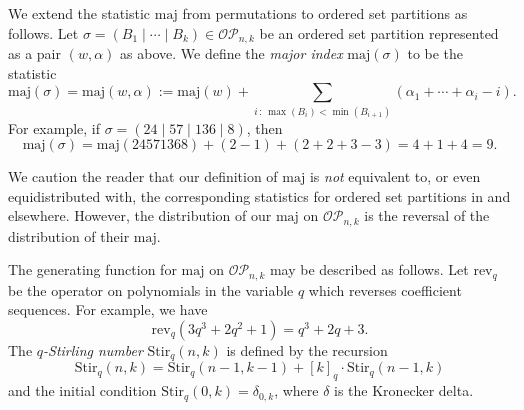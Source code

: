 \documentclass[ALCO,ThmDefs,published]{cedram}
\newcommand{\symm}{{\mathfrak{S}}}
\theoremstyle{plain}
\newcommand{\maj}{{\mathrm {maj}}}
\newcommand{\inv}{{\mathrm {inv}}}
\newcommand{\Stir}{{\mathrm {Stir}}}
\newcommand{\rev}{{\mathrm {rev}}}
\newcommand{\symm}{{\mathfrak{S}}}
\newcommand{\OP}{{\mathcal{OP}}}
\begin{document}



We extend the statistic $\maj$ from permutations to ordered set partitions as follows.
Let $\sigma = (B_1 \mid \cdots \mid B_k) \in \OP_{n,k}$ be an ordered set partition represented as a pair $(w, \alpha)$ as above.  
We define the \emph{major index} $\maj(\sigma)$ to be the statistic
\begin{equation}
\maj(\sigma) = \maj(w, \alpha) := \maj(w) + \sum_{i \,  : \,  \max(B_i) < \min(B_{i+1})} (\alpha_1 + \cdots + \alpha_i - i).
\end{equation}
For example, if $\sigma = ( 2 4 \mid 5 7 \mid 1 3 6 \mid 8)$, then
\begin{equation*}
\maj(\sigma) = \maj(24571368) + (2 - 1) + (2 + 2 + 3 - 3) = 4 + 1 + 4 = 9.
\end{equation*}

We caution the reader that our definition of
$\maj$ is \emph{not} equivalent to, or even equidistributed with,
the corresponding statistics for ordered set partitions in \cite{RW, HRS} and elsewhere.  
However,
the distribution of our $\maj$ on $\OP_{n,k}$ is the reversal of the distribution of their $\maj$.


The generating function for $\maj$ on $\OP_{n,k}$ may be described as follows.  
Let $\rev_q$ be the operator on polynomials in the variable $q$ which reverses coefficient sequences.
For example, we have
\begin{equation*}
\rev_q(3q^3 + 2q^2 + 1) = q^3 + 2q + 3.
\end{equation*}
The \emph{$q$-Stirling number} $\Stir_q(n,k)$ is defined by the recursion
\begin{equation}
\Stir_q(n,k) = \Stir_q(n-1,k-1) + [k]_q \cdot \Stir_q(n-1,k)
\end{equation}
and the initial condition $\Stir_q(0,k) = \delta_{0,k}$, where $\delta$ is the Kronecker delta.
\end{document}
